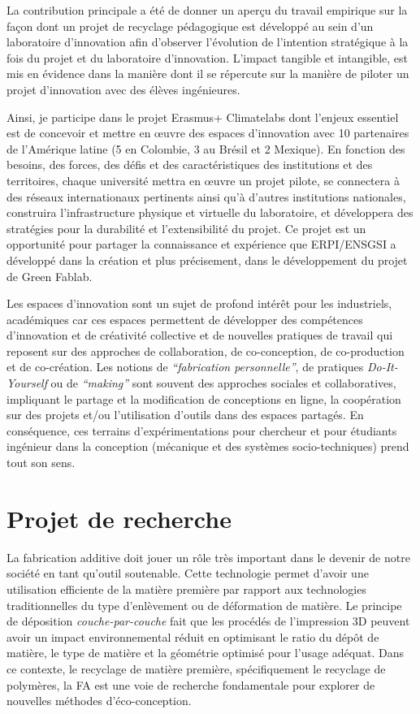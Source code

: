 \documentclass[
  12pt,
  oneside]{book}
\begin{document}
La contribution principale a été de donner un aperçu du travail empirique sur la façon dont un projet de recyclage pédagogique est développé au sein d'un laboratoire d'innovation afin d'observer l'évolution de l'intention stratégique à la fois du projet et du laboratoire d'innovation. L'impact tangible et intangible, est mis en évidence dans la manière dont il se répercute sur la manière de piloter un projet d'innovation avec des élèves ingénieures.

Ainsi, je participe dans le projet Erasmus+ Climatelabs dont l'enjeux essentiel est de concevoir et mettre en œuvre des espaces d'innovation avec 10 partenaires de l'Amérique latine (5 en Colombie, 3 au Brésil et 2 Mexique). En fonction des besoins, des forces, des défis et des caractéristiques des institutions et des territoires, chaque université mettra en œuvre un projet pilote, se connectera à des réseaux internationaux pertinents ainsi qu'à d'autres institutions nationales, construira l'infrastructure physique et virtuelle du laboratoire, et développera des stratégies pour la durabilité et l'extensibilité du projet. Ce projet est un opportunité pour partager la connaissance et expérience que ERPI/ENSGSI a développé dans la création et plus précisement, dans le développement du projet de Green Fablab.

Les espaces d'innovation sont un sujet de profond intérêt pour les industriels, académiques car ces espaces permettent de développer des compétences d'innovation et de créativité collective et de nouvelles pratiques de travail qui reposent sur des approches de collaboration, de co-conception, de co-production et de co-création.
Les notions de \emph{``fabrication personnelle''}, de pratiques \emph{Do-It-Yourself} ou de \emph{``making''} sont souvent des approches sociales et collaboratives, impliquant le partage et la modification de conceptions en ligne, la coopération sur des projets et/ou l'utilisation d'outils dans des espaces partagés.
En conséquence, ces terrains d'expérimentations pour chercheur et pour étudiants ingénieur dans la conception (mécanique et des systèmes socio-techniques) prend tout son sens.

\hypertarget{projet-de-recherche}{%
\section{Projet de recherche}\label{projet-de-recherche}}

La fabrication additive doit jouer un rôle très important dans le devenir de notre société en tant qu'outil soutenable. Cette technologie permet d'avoir une utilisation efficiente de la matière première par rapport aux technologies traditionnelles du type d'enlèvement ou de déformation de matière. Le principe de déposition \emph{couche-par-couche} fait que les procédés de l'impression 3D peuvent avoir un impact environnemental réduit en optimisant le ratio du dépôt de matière, le type de matière et la géométrie optimisé pour l'usage adéquat. Dans ce contexte, le recyclage de matière première, spécifiquement le recyclage de polymères, la FA est une voie de recherche fondamentale pour explorer de nouvelles méthodes d'éco-conception.
\end{document}
